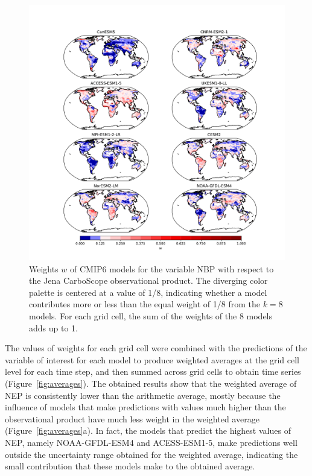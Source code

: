 \documentclass[gmd, manuscript]{copernicus}
\begin{document}
\begin{figure}[htbp]
   \centering
   \includegraphics[width=14cm, trim={3cm, 1cm, 2.5cm, 1cm}, clip]{Figures/CMIP6_CarboScope_weights.pdf} %
   \caption{Weights $w$ of CMIP6 models for the variable NBP with respect to the Jena CarboScope observational product. The diverging color palette is centered at a value of 1/8,  indicating whether a model contributes more or less than the equal weight of 1/8 from the $k= 8$ models. For each grid cell, the sum of the weights of the 8 models adds up to 1. }
   \label{fig:wCarboScope}
\end{figure}

\clearpage

The values of weights for each grid cell were combined with the predictions of the variable of interest for each model to produce weighted averages at the grid cell level for each time step, and then summed across grid cells to obtain time series (Figure~\ref{fig:averages}).
The obtained results show that the weighted average of NEP  is consistently lower than the arithmetic average, mostly because the influence of models that make predictions with values much higher than the observational product have much less weight in the weighted average (Figure~\ref{fig:averages}a). In fact, the models that predict the highest values of NEP, namely NOAA-GFDL-ESM4 and ACESS-ESM1-5, make predictions well outside the uncertainty range obtained for the weighted average, indicating the small contribution that these models make to the obtained average. 
\end{document}
